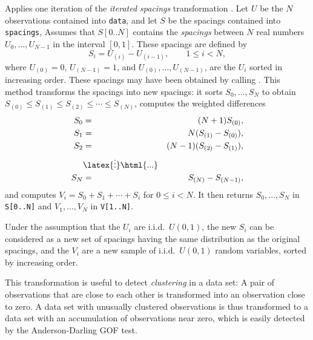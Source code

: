  \begin{tabb} Applies one iteration of the {\em iterated spacings\/}
   transformation \cite{rKNU98a,tSTE86a}.
   Let $U$ be the $N$ observations contained into \texttt{data},
   and let $S$ be the spacings contained into \texttt{spacings},
   Assumes that $S[0..N]$ contains the {\em spacings\/}
   between $N$ real numbers $U_0,\dots,U_{N-1}$ in the interval $[0,1]$.
   These spacings are defined by
    $$ S_i = U_{(i)} - U_{(i-1)},  \qquad  1\le i < N, $$
   where $U_{(0)}=0$, $U_{(N-1)}=1$, and
   $U_{(0)},\dots,U_{(N-1)}$,  are the $U_i$ sorted in increasing order.
   These spacings may have been obtained by calling
   .
   This method transforms the spacings into new
   spacings:
   it sorts $S_0,\dots,S_N$ to obtain
   $S_{(0)} \le S_{(1)} \le S_{(2)} \le \cdots \le S_{(N)}$,
   computes the weighted differences
  \begin {eqnarray*}
    S_{0}   &=& (N+1) S_{(0)}, \\
    S_{1}   &=& N (S_{(1)}-S_{(0)}), \\
    S_{2}   &=& (N-1) (S_{(2)}-S_{(1)}),\\
            & \latex{\vdots}\html{...}& \\
    S_{N}   &=& S_{(N)}-S_{(N-1)},
  \end {eqnarray*}
   and computes $V_i = S_0 + S_1 + \cdots + S_i$ for $0\le i < N$.
   It then returns $S_0,\dots,S_N$ in \texttt{S[0..N]} and
   $V_1,\dots,V_N$ in \texttt{V[1..N]}.

  Under the assumption that the $U_i$ are i.i.d.\ $U (0,1)$, the new
  $S_i$ can be considered as a new set of spacings having the same
  distribution as the original spacings, and the $V_i$ are a new sample
  of i.i.d.\ $U (0,1)$ random variables, sorted by increasing order.

  This transformation is useful to detect {\em clustering\/} in a data
  set: A pair of observations that are close to each other is transformed
  into an observation close to zero.  A data set with unusually clustered
  observations is thus transformed to a data set with an
  accumulation of observations near zero, which is easily detected by
  the Anderson-Darling GOF test.
 \end{tabb}
\begin{htmlonly}
\end{htmlonly}
